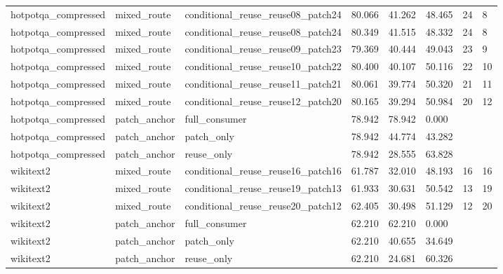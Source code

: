 \begin{tabular}{llllllll}
hotpotqa\_compressed & mixed\_route & conditional\_reuse\_reuse08\_patch24 & 80.066 & 41.262 & 48.465 & 24 & 8 \\
hotpotqa\_compressed & mixed\_route & conditional\_reuse\_reuse08\_patch24 & 80.349 & 41.515 & 48.332 & 24 & 8 \\
hotpotqa\_compressed & mixed\_route & conditional\_reuse\_reuse09\_patch23 & 79.369 & 40.444 & 49.043 & 23 & 9 \\
hotpotqa\_compressed & mixed\_route & conditional\_reuse\_reuse10\_patch22 & 80.400 & 40.107 & 50.116 & 22 & 10 \\
hotpotqa\_compressed & mixed\_route & conditional\_reuse\_reuse11\_patch21 & 80.061 & 39.774 & 50.320 & 21 & 11 \\
hotpotqa\_compressed & mixed\_route & conditional\_reuse\_reuse12\_patch20 & 80.165 & 39.294 & 50.984 & 20 & 12 \\
hotpotqa\_compressed & patch\_anchor & full\_consumer & 78.942 & 78.942 & 0.000 &  &  \\
hotpotqa\_compressed & patch\_anchor & patch\_only & 78.942 & 44.774 & 43.282 &  &  \\
hotpotqa\_compressed & patch\_anchor & reuse\_only & 78.942 & 28.555 & 63.828 &  &  \\
wikitext2 & mixed\_route & conditional\_reuse\_reuse16\_patch16 & 61.787 & 32.010 & 48.193 & 16 & 16 \\
wikitext2 & mixed\_route & conditional\_reuse\_reuse19\_patch13 & 61.933 & 30.631 & 50.542 & 13 & 19 \\
wikitext2 & mixed\_route & conditional\_reuse\_reuse20\_patch12 & 62.405 & 30.498 & 51.129 & 12 & 20 \\
wikitext2 & patch\_anchor & full\_consumer & 62.210 & 62.210 & 0.000 &  &  \\
wikitext2 & patch\_anchor & patch\_only & 62.210 & 40.655 & 34.649 &  &  \\
wikitext2 & patch\_anchor & reuse\_only & 62.210 & 24.681 & 60.326 &  &  \\
\bottomrule
\end{tabular}
